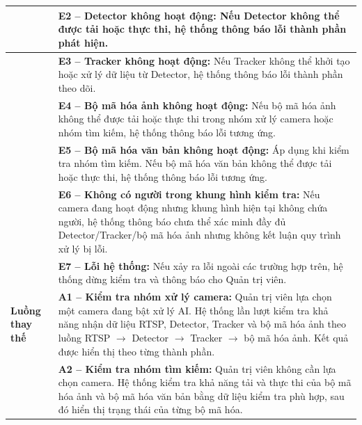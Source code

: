 \begin{longtable}{|>{\raggedright\arraybackslash}p{2.9cm}|p{12.3cm}|}
 & \textbf{E2 -- Detector không hoạt động:} Nếu Detector không thể được tải hoặc thực thi, hệ thống thông báo lỗi thành phần phát hiện. \\ \cline{2-2}
 & \textbf{E3 -- Tracker không hoạt động:} Nếu Tracker không thể khởi tạo hoặc xử lý dữ liệu từ Detector, hệ thống thông báo lỗi thành phần theo dõi. \\ \cline{2-2}
 & \textbf{E4 -- Bộ mã hóa ảnh không hoạt động:} Nếu bộ mã hóa ảnh không thể được tải hoặc thực thi trong nhóm xử lý camera hoặc nhóm tìm kiếm, hệ thống thông báo lỗi tương ứng. \\ \cline{2-2}
 & \textbf{E5 -- Bộ mã hóa văn bản không hoạt động:} Áp dụng khi kiểm tra nhóm tìm kiếm. Nếu bộ mã hóa văn bản không thể được tải hoặc thực thi, hệ thống thông báo lỗi tương ứng. \\ \cline{2-2}
 & \textbf{E6 -- Không có người trong khung hình kiểm tra:} Nếu camera đang hoạt động nhưng khung hình hiện tại không chứa người, hệ thống thông báo chưa thể xác minh đầy đủ Detector/Tracker/bộ mã hóa ảnh nhưng không kết luận quy trình xử lý bị lỗi. \\ \cline{2-2}
 & \textbf{E7 -- Lỗi hệ thống:} Nếu xảy ra lỗi ngoài các trường hợp trên, hệ thống dừng kiểm tra và thông báo cho Quản trị viên. \\ \hline
\textbf{Luồng thay thế} & \textbf{A1 -- Kiểm tra nhóm xử lý camera:} Quản trị viên lựa chọn một camera đang bật xử lý AI. Hệ thống lần lượt kiểm tra khả năng nhận dữ liệu RTSP, Detector, Tracker và bộ mã hóa ảnh theo luồng RTSP $\rightarrow$ Detector $\rightarrow$ Tracker $\rightarrow$ bộ mã hóa ảnh. Kết quả được hiển thị theo từng thành phần. \\ \cline{2-2}
 & \textbf{A2 -- Kiểm tra nhóm tìm kiếm:} Quản trị viên không cần lựa chọn camera. Hệ thống kiểm tra khả năng tải và thực thi của bộ mã hóa ảnh và bộ mã hóa văn bản bằng dữ liệu kiểm tra phù hợp, sau đó hiển thị trạng thái của từng bộ mã hóa. \\ \hline
\end{longtable}

